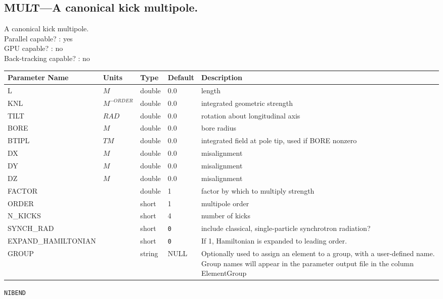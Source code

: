 \subsection{MULT---A canonical kick multipole.}
A canonical kick multipole.
\\
Parallel capable? : yes\\
GPU capable? : no\\
Back-tracking capable? : no\\
\begin{tabular}{|l|l|l|l|p{\descwidth}|} \hline
Parameter Name & Units & Type & Default & Description \\ \hline 
L & $M$ & double &  0.0 & length  \\ \hline 
KNL & $M^{-ORDER}$ & double &  0.0 & integrated geometric strength  \\ \hline 
TILT & $RAD$ & double &  0.0 & rotation about longitudinal axis  \\ \hline 
BORE & $M$ & double &  0.0 & bore radius  \\ \hline 
BTIPL & $T M$ & double &  0.0 & integrated field at pole tip, used if BORE nonzero  \\ \hline 
DX & $M$ & double &  0.0 & misalignment  \\ \hline 
DY & $M$ & double &  0.0 & misalignment  \\ \hline 
DZ & $M$ & double &  0.0 & misalignment  \\ \hline 
FACTOR &  & double &   1 & factor by which to multiply strength  \\ \hline 
ORDER &  & short &   1               & multipole order  \\ \hline 
N\_KICKS &  & short &   4               & number of kicks  \\ \hline 
SYNCH\_RAD &  & short &  \verb|0| & include classical, single-particle synchrotron radiation?  \\ \hline 
EXPAND\_HAMILTONIAN &  & short &  \verb|0| & If 1, Hamiltonian is expanded to leading order.  \\ \hline 
GROUP &  & string & NULL & Optionally used to assign an element to a group, with a user-defined name.  Group names will appear in the parameter output file in the column ElementGroup  \\ \hline 
\end{tabular}

\vspace*{0.5in}

\newpage
\begin{center}{\Large\verb|NIBEND|}\end{center}
